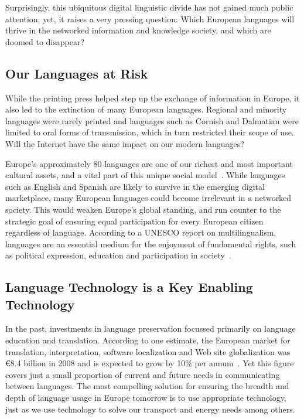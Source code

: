 \begin{multicols}{2}
Surprisingly, this ubiquitous digital linguistic divide has not gained much public attention; yet, it raises a very pressing question: Which European languages will thrive in the networked information and knowledge society, and which are doomed to disappear?

\subsection{Our Languages at Risk}

While the printing press helped step up the exchange of information in Europe, it also led to the extinction of many European languages. Regional and minority languages were rarely printed and languages such as Cornish and Dalmatian were limited to oral forms of transmission, which in turn restricted their scope of use. Will the Internet have the same impact on our modern languages?


Europe's approximately 80 languages are one of our richest and most important cultural assets, and a vital part of this unique social model~\cite{EC2}. While languages such as English and Spanish are likely to survive in the emerging digital marketplace, many European languages could become irrelevant in a networked society. This would weaken Europe's global standing, and run counter to the strategic goal of ensuring equal participation for every European citizen regardless of language. According to a UNESCO report on multilingualism, languages are an essential medium for the enjoyment of fundamental rights, such as political expression, education and participation in society~\cite{UNESCO2007}.

\subsection{Language Technology is a Key Enabling Technology}

In the past, investments in language preservation focussed primarily on language education and translation. According to one estimate, the European market for translation, interpretation, software localization and Web site globalization was €8.4 billion in 2008 and is expected to grow by 10\% per annum~\cite{EC3}. Yet this figure covers just a small proportion of current and future needs in communicating between languages. The most compelling solution for ensuring the breadth and depth of language usage in Europe tomorrow is to use appropriate technology, just as we use technology to solve our transport and energy needs among others.


\end{multicols}

